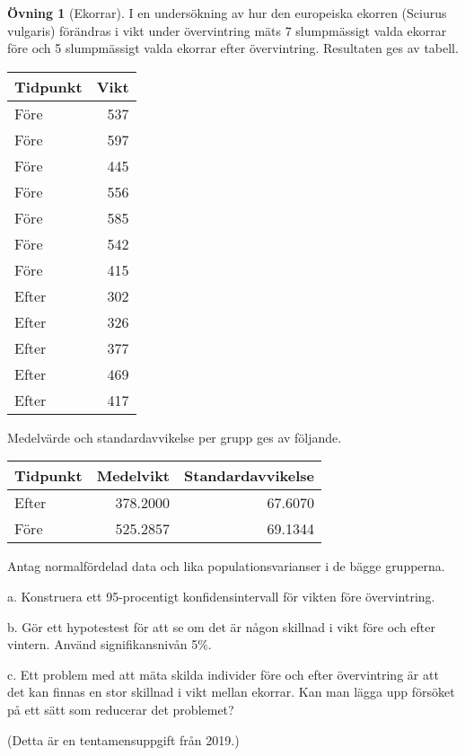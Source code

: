\documentclass[
]{book}
\theoremstyle{definition}
\theoremstyle{definition}
\theoremstyle{definition}
\newtheorem{exercise}{Övning}[chapter]
\theoremstyle{definition}
\theoremstyle{remark}
\begin{document}
\begin{exercise}[Ekorrar]
I en undersökning av hur den europeiska ekorren (Sciurus vulgaris) förändras i vikt under övervintring mäts 7 slumpmässigt valda ekorrar före och 5 slumpmässigt valda ekorrar efter övervintring.
Resultaten ges av tabell.

\begin{table}
\centering
\begin{tabular}[t]{lr}
\toprule
Tidpunkt & Vikt\\
\midrule
Före & 537\\
Före & 597\\
Före & 445\\
Före & 556\\
Före & 585\\
\addlinespace
Före & 542\\
Före & 415\\
Efter & 302\\
Efter & 326\\
Efter & 377\\
\addlinespace
Efter & 469\\
Efter & 417\\
\bottomrule
\end{tabular}
\end{table}

Medelvärde och standardavvikelse per grupp ges av följande.

\begin{table}
\centering
\begin{tabular}[t]{lrr}
\toprule
Tidpunkt & Medelvikt & Standardavvikelse\\
\midrule
Efter & 378.2000 & 67.6070\\
Före & 525.2857 & 69.1344\\
\bottomrule
\end{tabular}
\end{table}

Antag normalfördelad data och lika populationsvarianser i de bägge grupperna.

a. Konstruera ett 95-procentigt konfidensintervall för vikten före övervintring.

b. Gör ett hypotestest för att se om det är någon skillnad i vikt före och efter vintern. Använd signifikansnivån 5\%.

c. Ett problem med att mäta skilda individer före och efter övervintring är att det kan finnas en stor skillnad i vikt mellan ekorrar. Kan man lägga upp försöket på ett sätt som reducerar det problemet?

(Detta är en tentamensuppgift från 2019.)
\end{exercise}
\end{document}
